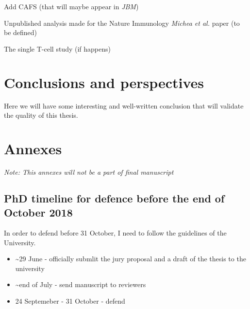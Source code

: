 \documentclass[12pt,]{book}
\providecommand{\tightlist}{%
  \setlength{\itemsep}{0pt}\setlength{\parskip}{0pt}}
\theoremstyle{definition}
\theoremstyle{definition}
\theoremstyle{definition}
\theoremstyle{remark}
\begin{document}
Add CAFS (that will maybe appear in \emph{JBM})

Unpublished analysis made for the Nature Immunology \emph{Michea et al.}
paper (to be defined)

The single T-cell study (if happens)



\hypertarget{conclusions}{%
\chapter{Conclusions and perspectives}\label{conclusions}}

Here we will have some interesting and well-written conclusion that will
validate the quality of this thesis.

\hypertarget{annexes}{%
\chapter*{Annexes}\label{annexes}}

\emph{Note: This annexes will not be a part of final manuscript}

\hypertarget{phd-timeline-for-defence-before-the-end-of-october-2018}{%
\section*{PhD timeline for defence before the end of October
2018}\label{phd-timeline-for-defence-before-the-end-of-october-2018}}

In order to defend before 31 October, I need to follow the guidelines of
the University.

\begin{itemize}
\tightlist
\item
  \textasciitilde{}29 June - officially submlit the jury proposal and a
  draft of the thesis to the university
\item
  \textasciitilde{}end of July - send manuscript to reviewers
\item
  24 Septemeber - 31 October - defend
\end{itemize}
\end{document}
